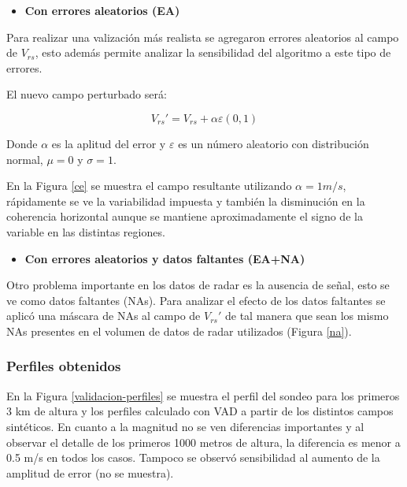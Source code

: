 \documentclass[12pt,spanish,oneside]{book}
\providecommand{\tightlist}{%
  \setlength{\itemsep}{0pt}\setlength{\parskip}{0pt}}
\begin{document}
\begin{itemize}
\tightlist
\item
  \textbf{Con errores aleatorios (EA)}
\end{itemize}

Para realizar una valización más realista se agregaron errores
aleatorios al campo de \(V_{rs}\), esto además permite analizar la
sensibilidad del algoritmo a este tipo de errores.

El nuevo campo perturbado será:

\begin{equation} \label{eq-vr12}
V_{rs}'  = V_{rs} + \alpha \varepsilon(0,1)
\end{equation}

Donde \(\alpha\) es la aplitud del error y \(\varepsilon\) es un número
aleatorio con distribución normal, \(\mu = 0\) y \(\sigma= 1\).

En la Figura \ref{ce} se muestra el campo resultante utilizando
\(\alpha = 1 m/s\), rápidamente se ve la variabilidad impuesta y también
la disminución en la coherencia horizontal aunque se mantiene
aproximadamente el signo de la variable en las distintas regiones.

\begin{itemize}
\tightlist
\item
  \textbf{Con errores aleatorios y datos faltantes (EA+NA)}
\end{itemize}

Otro problema importante en los datos de radar es la ausencia de señal,
esto se ve como datos faltantes (NAs). Para analizar el efecto de los
datos faltantes se aplicó una máscara de NAs al campo de \(V_{rs}'\) de
tal manera que sean los mismo NAs presentes en el volumen de datos de
radar utilizados (Figura \ref{na}).

\subsubsection{Perfiles obtenidos}\label{perfiles-obtenidos}

En la Figura \ref{validacion-perfiles} se muestra el perfil del sondeo
para los primeros 3 km de altura y los perfiles calculado con VAD a
partir de los distintos campos sintéticos. En cuanto a la magnitud no se
ven diferencias importantes y al observar el detalle de los primeros
1000 metros de altura, la diferencia es menor a 0.5 m/s en todos los
casos. Tampoco se observó sensibilidad al aumento de la amplitud de
error (no se muestra).
\end{document}

